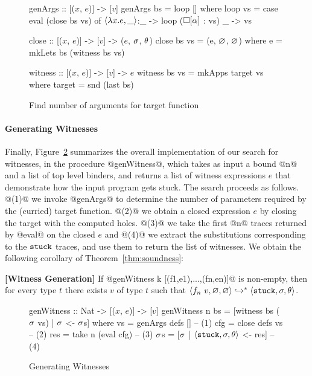 \begin{figure}[t]
\centering
\begin{mcode}
genArgs :: [($x$, $e$)] -> [$v$]
genArgs bs = loop []
  where
  loop vs  = case eval (close bs vs) of
               $\langle \lambda x. e, \_ \rangle$:_ -> loop ($\square[\alpha]$ : vs)
               _        -> vs

close :: [($x$, $e$)] -> [$v$] -> ($e$, $\sigma$, $\theta$)
close bs vs = (e, $\varnothing$, $\varnothing$)
  where
    e       = mkLets bs (witness bs vs)

witness :: [($x$, $e$)] -> [$v$] -> $e$
witness bs vs = mkApps target vs
  where
    target    = snd (last bs)
\end{mcode}
\caption{Find number of arguments for target function}
\label{fig:algo-gen-args}
\end{figure}


\paragraph{Generating Witnesses}
%
Finally, Figure~\ref{fig:algo-gen-witness} summarizes the overall
implementation of our search for witnesses, in the procedure @genWitness@,
which takes as input a bound @n@ and a list of top level binders, and
returns a list of witness expressions $e$ that demonstrate how the input
program gets stuck.
%
The search proceeds as follows.
%
@(1)@ we invoke @genArgs@ to determine the number of parameters required
by the (curried) target function.
%
@(2)@ we obtain a closed expression $e$ by closing the target with the
computed holes.
%
@(3)@ we take the first @n@ traces returned by @eval@ on the closed $e$
and
@(4)@ we extract the substitutions corresponding to the $\mathtt{stuck}$ traces,
and use them to return the list of witnesses.
%
We obtain the following corollary of Theorem~\ref{thm:soundness}:

\begin{cor}{\textbf{[Witness Generation]}}
\label{thm:generation}
  If @genWitness k [(f1,e1),...,(fn,en)]@ is non-empty,
  then for every type $t$ there exists $v$ of type $t$ such that
  $\langle f_n\ v, \varnothing, \varnothing \rangle \hookrightarrow^{*} \langle \mathtt{stuck}, \sigma, \theta \rangle$.
\end{cor}

\begin{figure}[t]
\centering
\begin{mcode}
genWitness :: Nat -> [($x$, $e$)] -> [$v$]
genWitness n bs
       = [witness bs ($\sigma$ vs) | $\sigma$ <- $\sigma$s]
  where
   vs  = genArgs defs []        -- (1)
   cfg = close defs vs          -- (2)
   res = take n (eval cfg)      -- (3)
   $\sigma$s   = [$\sigma$ | $\langle \mathtt{stuck}, \sigma, \theta \rangle$ <- res]  -- (4)
\end{mcode}
\caption{Generating Witnesses}
\label{fig:algo-gen-witness}
\end{figure}

